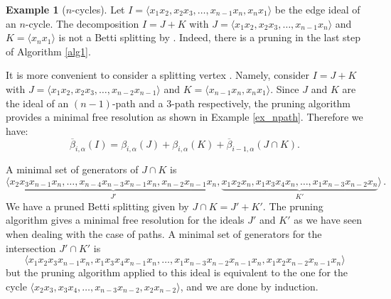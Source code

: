 \documentclass[12pt]{amsart}
\theoremstyle{definition}
\newtheorem{example}[theorem]{Example}
\theoremstyle{remark}
\numberwithin{equation}{section}
\begin{document}
\begin{example}[$n$-cycles]
Let $I= \langle x_1x_2,x_2x_3,\dots,x_{n-1}x_n,x_nx_1 \rangle$ be the edge ideal of
an $n$-cycle. The decomposition $I=J+K$ with $J= \langle
x_1x_2,x_2x_3,\dots,x_{n-1}x_{n} \rangle$ and $K=\langle x_{n}x_1
\rangle$ is not a Betti splitting by \cite[Theorem 3.4]{FHV}.
Indeed, there is a pruning in the last step of Algorithm \ref{alg1}.



\vskip 2mm

It is more convenient to consider a splitting vertex . Namely,
consider $I=J+K$ with $J= \langle x_1x_2,x_2x_3,\dots,x_{n-2}x_{n-1}
\rangle$ and $K=\langle x_{n-1}x_{n}, x_{n}x_1 \rangle$. Since $J$ and $K$
are the ideal of an $(n-1)$-path and a $3$-path respectively, the pruning algorithm provides a
minimal free resolution as shown in Example \ref{ex_npath}. Therefore we have:
$$\overline{\beta}_{i,\alpha}(I)= {\beta}_{i,\alpha}(J)+{\beta}_{i,\alpha}(K)+\overline{\beta}_{i-1,\alpha}(J\cap
K).$$


\vskip 2mm
A minimal set of generators of $J\cap K$ is
$$\langle \underbrace{x_2x_3x_{n-1}x_{n},\dots,x_{n-4}x_{n-3}x_{n-1}x_{n},
x_{n-2}x_{n-1}x_{n}}_{J'}, \underbrace{
x_1x_2x_{n},x_1x_3x_{4}x_{n},\dots,x_{1}x_{n-3}x_{n-2}x_{n}}_{K'}
\rangle\,.$$
We have a pruned Betti splitting given by $J\cap K= J' + K'$. The
pruning algorithm gives a minimal free resolution for the ideals
$J'$ and $K'$ as we have seen when dealing with the case of paths. A
minimal set of generators for the intersection $J'\cap K'$ is
$$\langle x_1x_2x_3x_{n-1}x_n,x_1x_3x_{4}x_{n-1}x_n, \dots ,
x_1x_{n-3}x_{n-2}x_{n-1}x_n,x_{1}x_2x_{n-2}x_{n-1}x_n \rangle$$ but
the pruning algorithm applied to this ideal is equivalent to the one
for the cycle $\langle x_2x_3,x_3x_{4}, \dots ,
x_{n-3}x_{n-2},x_2x_{n-2} \rangle$, and we are done by induction.
\end{example}

\end{document}
